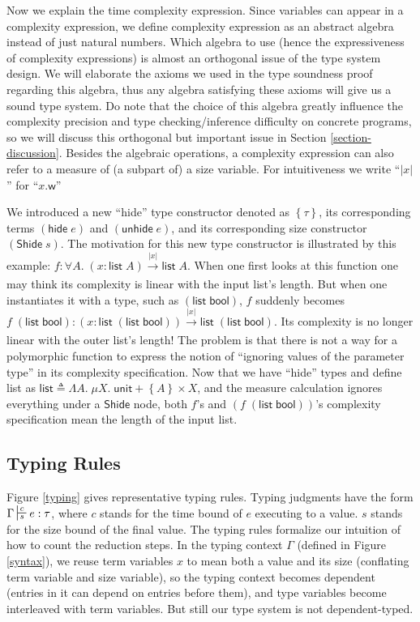 \documentclass[preprint]{sigplanconf}
\newcommand{\thide}[1]{\left \{ #1 \right \}}
\newcommand{\typing}[4]{\turnstile{s}{s}{#4}{#3}{n}#1:#2}
\newcommand{\arrow}[4]{#1\xrightarrow[#3]{#2}#4}
\newcommand{\symhide}{\mathsf{hide\;}}
\newcommand{\symShide}{\mathsf{Shide}}
\newcommand{\symunhide}{\mathsf{unhide\;}}
\newcommand{\symunit}{\mathsf{unit}}
\newcommand{\symlist}{\mathsf{list}}
\newcommand{\symbool}{\mathsf{bool}}
\newcommand{\intro}[2]{(#1 : #2)}
\newcommand{\defeq}{\triangleq}
\newcommand{\symwork}{\mathsf{w}}
\begin{document}
Now we explain the time complexity expression. Since variables can appear in a complexity expression, we define complexity expression as an abstract algebra instead of just natural numbers. Which algebra to use (hence the expressiveness of complexity expressions) is almost an orthogonal issue of the type system design. We will elaborate the axioms we used in the type soundness proof regarding this algebra, thus any algebra satisfying these axioms will give us a sound type system. Do note that the choice of this algebra greatly influence the complexity precision and type checking/inference difficulty on concrete programs, so we will discuss this orthogonal but important issue in Section \ref{section-discussion}. Besides the algebraic operations, a complexity expression can also refer to a measure of (a subpart of) a size variable. For intuitiveness we write ``$|x|$'' for ``$x.\symwork$''

We introduced a new ``hide'' type constructor denoted as $\thide{\tau}$, its corresponding terms $(\symhide e)$ and $(\symunhide e)$, and its corresponding size constructor $(\symShide\;s)$. The motivation for this new type constructor is illustrated by this example: $f:\forall A.\;\arrow{\intro{x}{\symlist\;A}}{|x|}{}{\symlist\;A}$. When one first looks at this function one may think its complexity is linear with the input list's length. But when one instantiates it with a type, such as $(\symlist\;\symbool)$, $f$ suddenly becomes $f\;(\symlist\;\symbool):\arrow{\intro{x}{\symlist\;(\symlist\;\symbool)}}{|x|}{}{\symlist\;(\symlist\;\symbool)}$. Its complexity is no longer linear with the outer list's length! The problem is that there is not a way for a polymorphic function to express the notion of ``ignoring values of the parameter type'' in its complexity specification. Now that we have ``hide'' types and define list as $\symlist \defeq \Lambda A.\;\mu X.\;\symunit + \thide{A} \times X$, and the measure calculation ignores everything under a $\symShide$ node, both $f$'s and $(f\;(\symlist\;\symbool))$'s complexity specification mean the length of the input list.

\subsection{Typing Rules}

Figure \ref{typing} gives representative typing rules. Typing judgments have the form $\Gamma\typing{e}{\tau}{c}{s}$, where $c$ stands for the time bound of $e$ executing to a value. $s$ stands for the size bound of the final value. The typing rules formalize our intuition of how to count the reduction steps. In the typing context $\Gamma$ (defined in Figure \ref{syntax}), we reuse term variables $x$ to mean both a value and its size (conflating term variable and size variable), so the typing context becomes dependent (entries in it can depend on entries before them), and type variables become interleaved with term variables. But still our type system is not dependent-typed.
\end{document}

